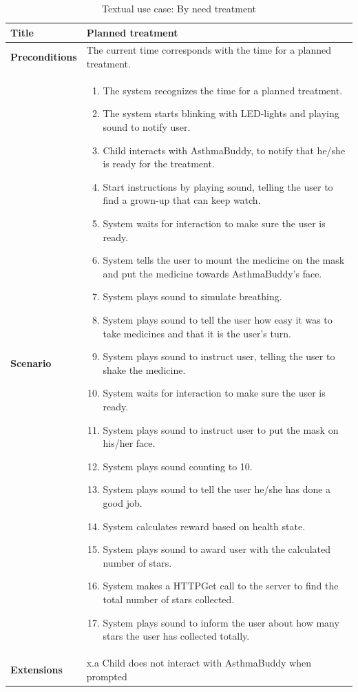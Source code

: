\begin{table}[H]
\centering
\begin{tabular}{|p{4.0cm} | p{9.0cm} |}
\hline
\textbf{Title} & Planned treatment \\
\hline
\textbf{Preconditions} & The current time corresponds with the time for a planned treatment. \\
\hline 
\textbf{Scenario} & 
	\begin{enumerate}
	  \itemsep0em
	  \item The system recognizes the time for a planned treatment.
	  \item The system starts blinking with LED-lights and playing sound to notify user.
	  \item Child interacts with AsthmaBuddy, to notify that he/she is ready for the treatment.
	  \item Start instructions by playing sound, telling the user to find a grown-up that can keep watch.
	  \item System waits for interaction to make sure the user is ready.
	  \item System tells the user to mount the medicine on the mask and put the medicine towards AsthmaBuddy's face.
	  \item System plays sound to simulate breathing.
	  \item System plays sound to tell the user how easy it was to take medicines and that it is the user's turn.
	  \item System plays sound to instruct user, telling the user to shake the medicine.
	  \item System waits for interaction to make sure the user is ready.
	  \item System plays sound to instruct user to put the mask on his/her face.
	  \item System plays sound counting to 10. 
	  \item System plays sound to tell the user he/she has done a good job.
	  \item System calculates reward based on health state.
	  \item System plays sound to award user with the calculated number of stars.
	  \item System makes a HTTPGet call to the server to find the total number of stars collected.
	  \item System plays sound to inform the user about how many stars the user has collected totally.
	\end{enumerate}
\\
\hline
	\textbf{Extensions} & 
		x.a Child does not interact with AsthmaBuddy when prompted
\\
\hline
\end{tabular}
\caption{Textual use case: By need treatment}
\label{tab:textual-use-case}
\end{table} 


